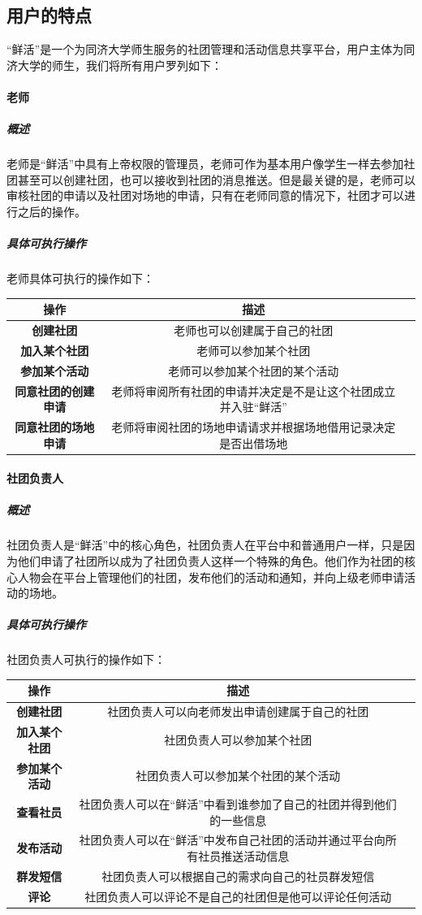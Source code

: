 \documentclass[UTF8]{ctexart}
\begin{document}
\subsection{用户的特点}
“鲜活”是一个为同济大学师生服务的社团管理和活动信息共享平台，用户主体为同济大学的师生，我们将所有用户罗列如下：

\paragraph{老师}
\subparagraph{概述}
老师是“鲜活”中具有上帝权限的管理员，老师可作为基本用户像学生一样去参加社团甚至可以创建社团，也可以接收到社团的消息推送。但是最关键的是，老师可以审核社团的申请以及社团对场地的申请，只有在老师同意的情况下，社团才可以进行之后的操作。
\subparagraph{具体可执行操作}
老师具体可执行的操作如下：
\newline
\newline
\begin{tabular}{ccc}
\toprule
操作& 描述\\
\midrule
\textbf{创建社团}& 老师也可以创建属于自己的社团\\
\textbf{加入某个社团}& 老师可以参加某个社团\\
\textbf{参加某个活动}&老师可以参加某个社团的某个活动\\
\textbf{同意社团的创建申请}&老师将审阅所有社团的申请并决定是不是让这个社团成立并入驻“鲜活”\\
\textbf{同意社团的场地申请}&老师将审阅社团的场地申请请求并根据场地借用记录决定是否出借场地\\
\bottomrule
\end{tabular}

\paragraph{社团负责人}
\subparagraph{概述}
社团负责人是“鲜活”中的核心角色，社团负责人在平台中和普通用户一样，只是因为他们申请了社团所以成为了社团负责人这样一个特殊的角色。他们作为社团的核心人物会在平台上管理他们的社团，发布他们的活动和通知，并向上级老师申请活动的场地。
\subparagraph{具体可执行操作}
社团负责人可执行的操作如下：
\newline
\newline
\begin{tabular}{ccc}
\toprule
操作& 描述\\
\midrule
\textbf{创建社团}& 社团负责人可以向老师发出申请创建属于自己的社团\\
\textbf{加入某个社团}& 社团负责人可以参加某个社团\\
\textbf{参加某个活动}&社团负责人可以参加某个社团的某个活动\\
\textbf{查看社员}&社团负责人可以在“鲜活”中看到谁参加了自己的社团并得到他们的一些信息\\
\textbf{发布活动}&社团负责人可以在“鲜活”中发布自己社团的活动并通过平台向所有社员推送活动信息\\
\textbf{群发短信}& 社团负责人可以根据自己的需求向自己的社员群发短信\\
\textbf{评论}& 社团负责人可以评论不是自己的社团但是他可以评论任何活动\\
\bottomrule
\end{tabular}
\end{document}
